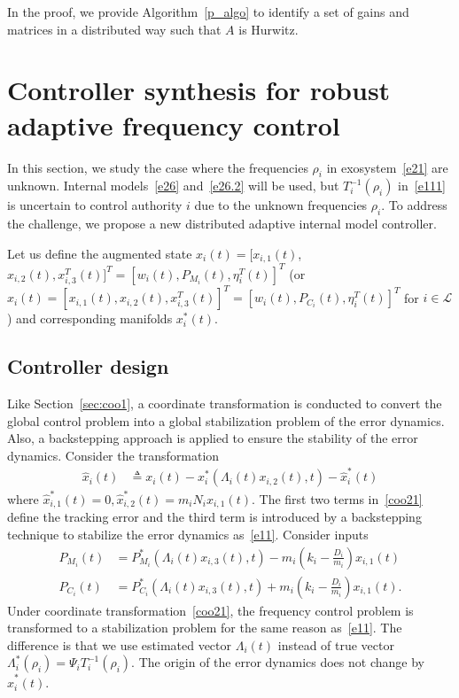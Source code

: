 \documentclass[journal]{IEEEtran}
\newcommand{\nnum}{\nonumber}
\newcommand{\LL}{{\mathcal{L}}}
\begin{document}
In the proof, we provide Algorithm~\ref{p_algo} to identify a set of gains and matrices in a distributed way such that $A$ is Hurwitz.

\section{Controller synthesis for robust adaptive frequency control}\label{sec:sol2}
In this section, we study the case where the frequencies $\rho_{i}$ in exosystem~\eqref{e21} are unknown.
Internal models~\eqref{e26} and~\eqref{e26.2} will be used, but $T_i^{-1}(\rho_i)$ in~\eqref{e111} is uncertain to control authority $i$ due to the unknown frequencies $\rho_i$.
To address the challenge, we propose a new distributed adaptive internal model controller.

Let us define the augmented state $x_i(t) = [x_{i,1}(t)$, $x_{i,2}(t),x_{i,3}^T(t)]^T=[w_i(t), P_{M_i}(t), \eta_i^T(t)]^T$ (or $x_i(t) = [x_{i,1}(t), x_{i,2}(t),x_{i,3}^T(t)]^T=[w_i(t), P_{C_i}(t), \eta_i^T(t)]^T$ for $i \in \LL$) and corresponding manifolds $x_i^*(t)$.





\subsection{Controller design}\label{sec:coo2}
Like Section~\ref{sec:coo1}, a coordinate transformation is conducted to convert the global control problem into a global stabilization problem of the error dynamics.
Also, a backstepping approach is applied to ensure the stability of the error dynamics.
Consider the transformation
\begin{align}
\hat{x}_i(t)&\triangleq x_i(t)-x_i^*(\Lambda_i(t)x_{i,2}(t),t)-\hat{x}_i^{*}(t)
\label{coo21}
\end{align}
where $\hat{x}_{i,1}^*(t) =0, \hat{x}_{i,2}^*(t) = m_iN_i x_{i,1}(t)$.
The first two terms in~\eqref{coo21} define the tracking error and the third term is introduced by a backstepping technique to stabilize the error dynamics as~\eqref{e11}.
Consider inputs
\begin{align}
P_{M_i} (t)&= P_{M_i}^*(\Lambda_i(t)x_{i,3}(t),t)-m_i (k_{i}-\frac{D_i}{m_i}) x_{i,1}(t)\nnum\\
P_{C_i}(t)&=P_{C_i}^{*}(\Lambda_i(t)x_{i,3}(t),t)+m_i (k_{i}-\frac{D_i}{m_i}) x_{i,1}(t).
\label{e_input2}
\end{align}
Under coordinate transformation~\eqref{coo21}, the frequency control problem is transformed to a stabilization problem for the same reason as~\eqref{e11}. The difference is that we use estimated vector $\Lambda_i(t)$ instead of true vector $\Lambda_i^*(\rho_i)=\Psi_iT_i^{-1}(\rho_i)$.
The origin of the error dynamics does not change by $\hat{x}_i^{*}(t)$.
\end{document}
